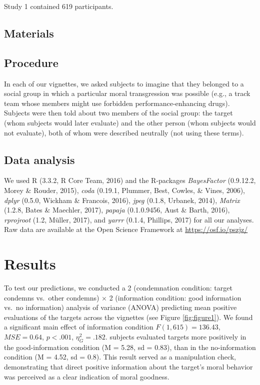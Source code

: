 \documentclass[english,man]{apa6}
\theoremstyle{definition}
\theoremstyle{definition}
\theoremstyle{remark}
\begin{document}
Study 1 contained 619 participants.

\subsection{Materials}\label{materials}

\subsection{Procedure}\label{procedure}

In each of our vignettes, we asked subjects to imagine that they
belonged to a social group in which a particular moral transgression was
possible (e.g., a track team whose members might use forbidden
performance-enhancing drugs). Subjects were then told about two members
of the social group: the target (whom subjects would later evaluate) and
the other person (whom subjects would not evaluate), both of whom were
described neutrally (not using these terms).

\subsection{Data analysis}\label{data-analysis}

We used R (3.3.2, R Core Team, 2016) and the R-packages
\emph{BayesFactor} (0.9.12.2, Morey \& Rouder, 2015), \emph{coda}
(0.19.1, Plummer, Best, Cowles, \& Vines, 2006), \emph{dplyr} (0.5.0,
Wickham \& Francois, 2016), \emph{jpeg} (0.1.8, Urbanek, 2014),
\emph{Matrix} (1.2.8, Bates \& Maechler, 2017), \emph{papaja}
(0.1.0.9456, Aust \& Barth, 2016), \emph{rprojroot} (1.2, Müller, 2017),
and \emph{yarrr} (0.1.4, Phillips, 2017) for all our analyses. Raw data
are available at the Open Science Framework at
\url{https://osf.io/pszjz/}

\section{Results}\label{results}

To test our predictions, we conducted a 2 (condemnation condition:
target condemns vs.~other condemns) × 2 (information condition: good
information vs.~no information) analysis of variance (ANOVA) predicting
mean positive evaluations of the targets across the vignettes (see
Figure \ref{fig:figure1}). We found a significant main effect of
information condition \(F(1, 615) = 136.43\), \(\mathit{MSE} = 0.64\),
\(p < .001\), \(\eta^2_G = .182\). subjects evaluated targets more
positively in the good-information condition (M = 5.28, sd = 0.83), than
in the no-information condition (M = 4.52, sd = 0.8). This result served
as a manipulation check, demonstrating that direct positive information
about the target's moral behavior was perceived as a clear indication of
moral goodness.
\end{document}
